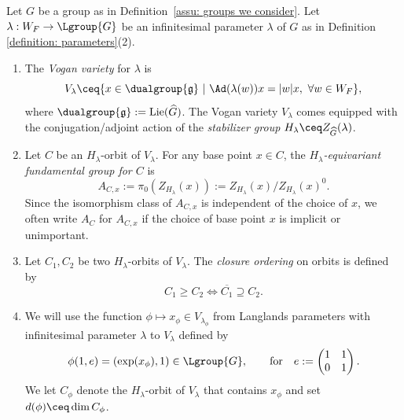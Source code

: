 \documentclass[11pt,letterpaper]{amsart}
\numberwithin{equation}{section}
\begin{document}
\begin{definition}\label{definition: Vogan variety}
Let $G$ be a group as in Definition~\ref{assu: groups we consider}.
Let $\lambda : W_F \to \Lgroup{G}$ be an infinitesimal parameter $\lambda$ of $G$ as in Definition \ref{definition: parameters}(2). 
    \begin{enumerate}
        \item  The {\it Vogan variety} for $\lambda$ is 
\[
    V_\lambda \ceq \{x \in \dualgroup{\mathfrak{g}} 
    ~ \vert ~ 
    \Ad(\lambda(w))x=|w|x, ~\forall w\in W_F \},
\]
where $\dualgroup{\mathfrak{g}}:= \mathrm{Lie}(\widehat{G})$.
The Vogan variety $V_\lambda$ comes equipped with the conjugation/adjoint action of the {\it stabilizer group} 
$H_\lambda\ceq Z_{\widehat{G}}(\lambda)$.
\item Let $C$ be an $H_{\lambda}$-orbit of $V_{\lambda}$. 
For any base point $x \in C$, the {\it $H_{\lambda}$-equivariant fundamental group for $C$} is 
\begin{equation}\label{eqn: equivariant fundamental group}
    A_{C,x}:=\pi_0(Z_{H_{\lambda}}(x))
    := Z_{H_{\lambda}}(x)/Z_{H_{\lambda}}(x)^0.
\end{equation}
Since the isomorphism class of $A_{C,x}$ is independent of the choice of $x$, we often write $A_{C}$ for $A_{C,x}$ if the choice of base point $x$ is implicit or unimportant.

\item Let $C_1, C_2$ be two $H_{\lambda}$-orbits of $V_{\lambda}$. The {\it closure ordering} on orbits is defined by
\[ 
C_1 \geq C_2 \Longleftrightarrow \overline{C_1} \supseteq C_2.
\]


\item We will use the function 
$
\phi \mapsto x_\phi \in V_{\lambda_\phi}
$
from Langlands parameters with infinitesimal parameter $\lambda$ to $V_\lambda$ defined by 
\[
 \phi(1,e) = (\exp(x_\phi),1) \in \Lgroup{G},
\qquad
\text{for}
\quad
e := 
\begin{pmatrix}
    1 & 1 \\ 0 & 1 
\end{pmatrix}.
\] 
We let $C_{\phi}$ 
denote the $H_{\lambda}$-orbit of $V_{\lambda}$ that contains $x_{\phi}$ and set 
$d(\phi) \ceq \dim C_{\phi}$.
    \end{enumerate}
\end{definition}
\end{document}
